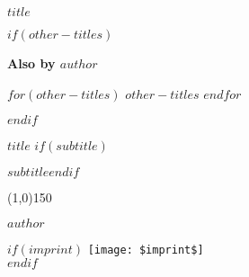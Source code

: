 \documentclass[$if(fontsize)$$fontsize$,$endif$$if(lang)$$babel-lang$,$endif$$if(papersize)$$papersize$paper,$endif$$if(beamer)$ignorenonframetext,$if(handout)$handout,$endif$$if(aspectratio)$aspectratio=$aspectratio$,$endif$$endif$$for(classoption)$$classoption$$sep$,$endfor$]{$documentclass$}
\begin{document}
  \sloppy %
  \setcounter{page}{1}

  \pagestyle{empty}
  \begin{center}
    \vspace*{\fill}

    \LARGE\textbf{\textsf{$title$}}

    \vspace*{\fill}
    \vspace*{\fill}
  \end{center}
  \clearpage

  \newpage
  \emph{ }\newline
  $if(other-titles)$
    \begin{center}
      \textbf{Also by $author$}

      $for(other-titles)$
      $other-titles$\newline
      $endfor$
    \end{center}
  $endif$
  \clearpage

  \begin{center}
    \vspace*{\fill}

    \Huge\textbf{\textsf{$title$}}
    $if(subtitle)$

    \vspace*{0.125in}\Large\textbf{\textsf{$subtitle$}}\newline$endif$

    \vspace*{0.25in}
    \line(1,0){150}
    \vspace*{0.25in}

    \Large\textsf{$author$}

    \vspace*{\fill}
    \vspace*{\fill}
    $if(imprint)$
    \texttt{[image: \$imprint\$]}\\[0cm]
    \vspace*{0.25in}
    $endif$
  \end{center}
  \clearpage
\end{document}
